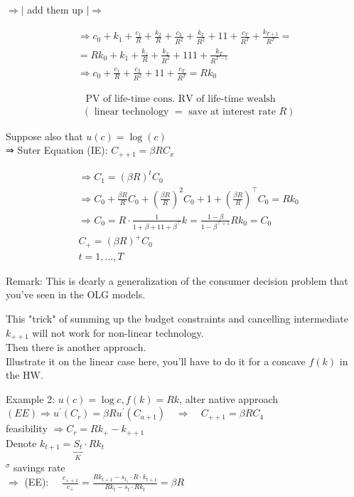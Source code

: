 \documentclass[10pt]{article}
\begin{document}
$\Rightarrow \mid$ add them up $\mid \Rightarrow$

$$
\begin{gathered}
\Rightarrow c_{0}+k_{1}+\frac{c_{1}}{R}+\frac{k_{2}}{R}+\frac{c_{2}}{R^{2}}+\frac{k_{2}}{R^{2}}+11+\frac{c_{T}}{R^{T}}+\frac{k_{T+1}}{R^{T}}= \\
=R k_{0}+k_{1}+\frac{k_{z}}{R}+\frac{k_{2}}{R^{2}}+111+\frac{k_{T}}{R^{T-1}} \\
\Rightarrow c_{0}+\frac{c_{1}}{R}+\frac{c_{2}}{R^{2}}+11+\frac{c_{T}}{R^{T}}=R k_{0}
\end{gathered}
$$

$$
\begin{aligned}
& \text { PV of life-time cons. RV of life-time wealsh } \\
& (\text { linear technology }=\text { save at interest rate } R)
\end{aligned}
$$

Suppose also that $u(c)=\log (c)$\\
⇒ Suter Equation (IE): $C_{++1}=\beta R C_{x}$

$$
\begin{aligned}
& \Rightarrow C_{1}=(\beta R)^{t} C_{0} \\
& \Rightarrow C_{0}+\frac{\beta R}{R} C_{0}+\left(\frac{\beta R}{R}\right)^{2} C_{0}+1+\left(\frac{\beta R}{R}\right)^{\top} C_{0}=R k_{0} \\
& \Rightarrow C_{0}=R \cdot \frac{1}{1+\beta+11+\beta^{\top}} k=\frac{1-\beta}{1-\beta^{\top+1}} R k_{0}=C_{0} \\
& C_{+}=(\beta R)^{+} C_{0} \\
& t=1, \ldots, T
\end{aligned}
$$

Remark: This is dearly a generalization of the consumer decision problem that you've seen in the OLG models.

This "trick" of summing up the budget constraints and cancelling intermediate $k_{++1}$ will not work for non-linear technology.\\
Then there is another approach.\\
Illustrate it on the linear case here, you'll have to do it for a concave $f(k)$ in the HW.

Example 2: $u(c)=\log c, f(k)=R k$, alter native approach $(E E) \Rightarrow u^{\prime}\left(C_{r}\right)=\beta R u^{\prime}\left(C_{a+1}\right) \quad \Rightarrow \quad C_{++1}=\beta R C_{4}$\\
feasibility $\Rightarrow C_{r}=R k_{+}-k_{++1}$\\
Denote $k_{t+1}=\underbrace{S_{t}}_{K} \cdot R k_{t}$\\
${ }^{\sigma}$ savings rate\\
$\Rightarrow$ (EE): $\quad \frac{c_{++1}}{c_{+}}=\frac{R k_{t+1}-s_{t_{1}} \cdot R \cdot k_{t+1}}{R k_{t}-s_{t} \cdot R k_{t}}=\beta R$
\end{document}
